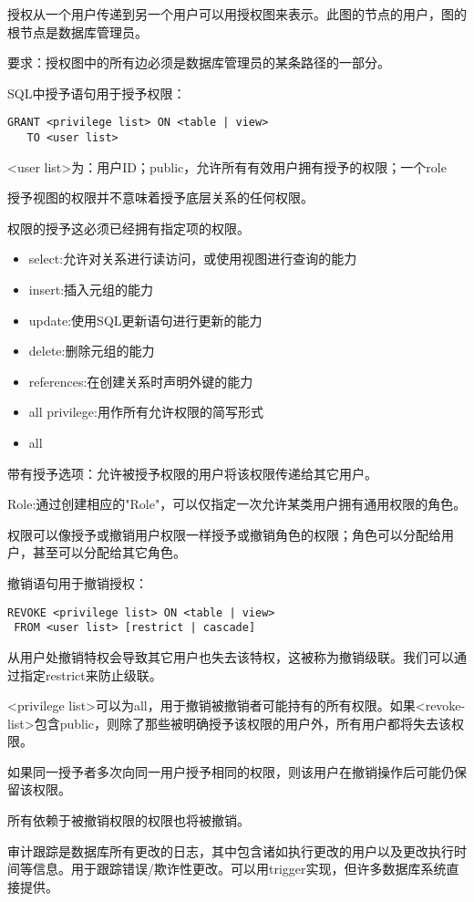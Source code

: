 授权从一个用户传递到另一个用户可以用授权图来表示。此图的节点的用户，图的根节点是数据库管理员。

要求：授权图中的所有边必须是数据库管理员的某条路径的一部分。

SQL中授予语句用于授予权限：
\begin{lstlisting}[style=sqlstyle]
GRANT <privilege list> ON <table | view>
   TO <user list>    
\end{lstlisting}

<user list>为：用户ID；public，允许所有有效用户拥有授予的权限；一个role

授予视图的权限并不意味着授予底层关系的任何权限。

权限的授予这必须已经拥有指定项的权限。

\begin{itemize}
    \item select:允许对关系进行读访问，或使用视图进行查询的能力
    \item insert:插入元组的能力
    \item update:使用SQL更新语句进行更新的能力
    \item delete:删除元组的能力
    \item references:在创建关系时声明外键的能力
    \item all privilege:用作所有允许权限的简写形式
    \item all
\end{itemize}

带有授予选项：允许被授予权限的用户将该权限传递给其它用户。

Role:通过创建相应的"Role"，可以仅指定一次允许某类用户拥有通用权限的角色。

权限可以像授予或撤销用户权限一样授予或撤销角色的权限；角色可以分配给用户，甚至可以分配给其它角色。

撤销语句用于撤销授权：
\begin{lstlisting}[style=sqlstyle]
 REVOKE <privilege list> ON <table | view>
 FROM <user list> [restrict | cascade]   
\end{lstlisting}

从用户处撤销特权会导致其它用户也失去该特权，这被称为撤销级联。我们可以通过指定restrict来防止级联。

<privilege list>可以为all，用于撤销被撤销者可能持有的所有权限。如果<revoke-list>包含public，则除了那些被明确授予该权限的用户外，所有用户都将失去该权限。

如果同一授予者多次向同一用户授予相同的权限，则该用户在撤销操作后可能仍保留该权限。

所有依赖于被撤销权限的权限也将被撤销。

审计跟踪是数据库所有更改的日志，其中包含诸如执行更改的用户以及更改执行时间等信息。用于跟踪错误/欺诈性更改。可以用trigger实现，但许多数据库系统直接提供。

